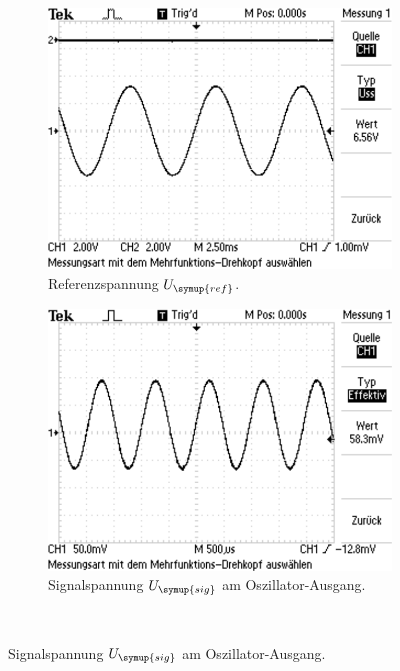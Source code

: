 \begin{figure}
  \centering
  \begin{subfigure}{0.45\textwidth}
    \centering
    \includegraphics[width=\textwidth]{1.png}
    \caption{Referenzspannung $U_{\symup{ref}}$.\\}
    \label{sub:1}
    \qquad
  \end{subfigure}
  \begin{subfigure}{0.45\textwidth}
    \centering
    \includegraphics[width=\textwidth]{2.png}
    \caption{Signalspannung $U_{\symup{sig}}$ am Oszillator-Ausgang.}
    \label{sub:2}
    \qquad
  \end{subfigure} \\

\end{figure}
